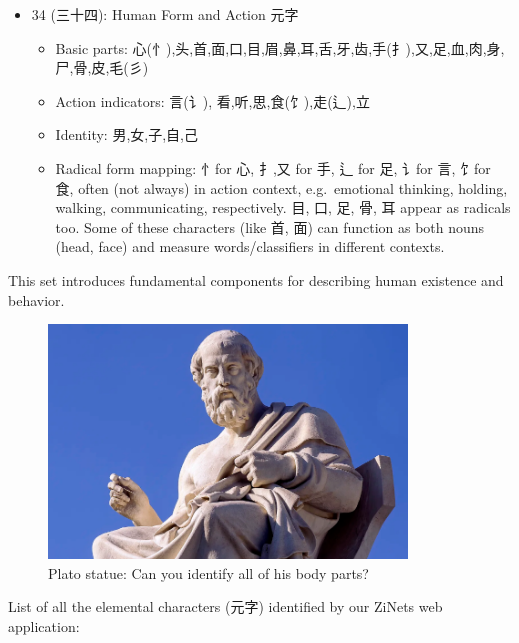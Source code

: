 \documentclass[
  11pt,
  letterpaper,
]{article}
\providecommand{\tightlist}{%
  \setlength{\itemsep}{0pt}\setlength{\parskip}{0pt}}
\begin{document}
\begin{itemize}
\tightlist
\item
  34 (三十四): Human Form and Action 元字

  \begin{itemize}
  \tightlist
  \item
    Basic parts:
    心(忄),头,首,面,口,目,眉,鼻,耳,舌,牙,齿,手(扌),又,足,血,肉,身,尸,骨,皮,毛(彡)
  \item
    Action indicators: 言(讠), 看,听,思,食(饣),走(辶),立
  \item
    Identity: 男,女,子,自,己
  \item
    Radical form mapping: 忄for 心, 扌,又 for 手, 辶 for 足, 讠for 言,
    饣for 食, often (not always) in action context, e.g.~emotional
    thinking, holding, walking, communicating, respectively. 目, 口, 足,
    骨, 耳 appear as radicals too. Some of these characters (like 首,
    面) can function as both nouns (head, face) and measure
    words/classifiers in different contexts.
  \end{itemize}
\end{itemize}

This set introduces fundamental components for describing human
existence and behavior.

\begin{figure}
\centering
\includegraphics[width=0.85\textwidth]{./images/plato.png}
\caption{Plato statue: Can you identify all of his body parts?}
\end{figure}

List of all the elemental characters (元字) identified by our ZiNets web
application:
\end{document}
